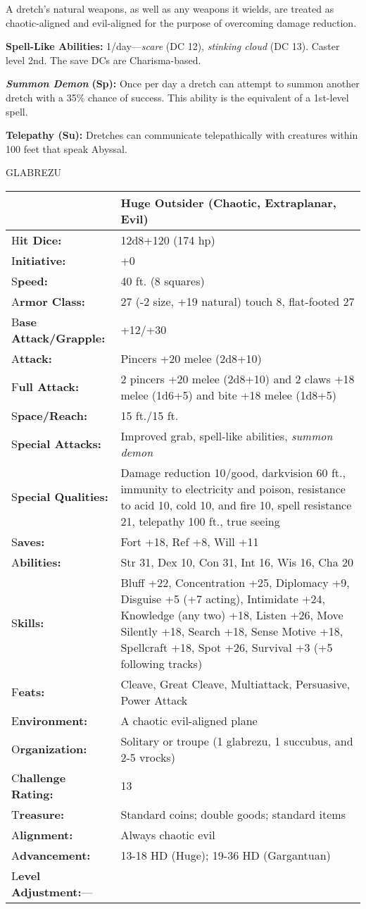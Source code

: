 \documentclass{article}
\begin{document}
A dretch's natural weapons, as well as any weapons it wields, are treated as chaotic-aligned 
and evil-aligned for the purpose of overcoming damage reduction.

\textbf{Spell-Like Abilities:} 1/day---\textit{scare }(DC 12), \textit{stinking 
cloud }(DC 13). Caster level 2nd. The save DCs are Charisma-based.

\textit{\textbf{Summon Demon }}\textbf{(Sp):} Once per day a dretch can attempt 
to summon another dretch with a 35\% chance of success. This ability is the equivalent 
of a 1st-level spell.

\textbf{Telepathy (Su): }Dretches can communicate telepathically with creatures 
within 100 feet that speak Abyssal.

\vspace{12pt}
GLABREZU

\begin{tabular}{|>{\raggedright}p{91pt}|>{\raggedright}p{203pt}|}
\hline
  & Huge Outsider (Chaotic, Extraplanar, Evil)\tabularnewline
\hline
H\textbf{it Dice:} & 12d8+120 (174 hp)\tabularnewline
\hline
I\textbf{nitiative:} & +0\tabularnewline
\hline
S\textbf{peed:} & 40 ft. (8 squares)\tabularnewline
\hline
A\textbf{rmor Class:} & 27 (-2 size, +19 natural) touch 8, flat-footed 27\tabularnewline
\hline
B\textbf{ase Attack/Grapple:} & +12/+30\tabularnewline
\hline
A\textbf{ttack:} & Pincers +20 melee (2d8+10)\tabularnewline
\hline
F\textbf{ull Attack:} & 2 pincers +20 melee (2d8+10) and 2 claws +18 melee (1d6+5) 
and bite +18 melee (1d8+5)\tabularnewline
\hline
S\textbf{pace/Reach:} & 15 ft./15 ft.\tabularnewline
\hline
S\textbf{pecial Attacks:} & Improved grab, spell-like abilities, \textit{summon 
demon}\tabularnewline
\hline
S\textbf{pecial Qualities:} & Damage reduction 10/good, darkvision 60 ft., immunity 
to electricity and poison, resistance to acid 10, cold 10, and fire 10, spell resistance 
21, telepathy 100 ft., true seeing\tabularnewline
\hline
S\textbf{aves:} & Fort +18, Ref +8, Will +11\tabularnewline
\hline
A\textbf{bilities:} & Str 31, Dex 10, Con 31, Int 16, Wis 16, Cha 20\tabularnewline
\hline
S\textbf{kills:} & Bluff +22, Concentration +25, Diplomacy +9, Disguise +5 (+7 
acting), Intimidate +24, Knowledge (any two) +18, Listen +26, Move Silently +18, 
Search +18, Sense Motive +18, Spellcraft +18, Spot +26, Survival +3 (+5 following 
tracks)\tabularnewline
\hline
F\textbf{eats:} & Cleave, Great Cleave, Multiattack, Persuasive, Power Attack\tabularnewline
\hline
E\textbf{nvironment:} & A chaotic evil-aligned plane\tabularnewline
\hline
O\textbf{rganization:} & Solitary or troupe (1 glabrezu, 1 succubus, and 2-5 vrocks)\tabularnewline
\hline
C\textbf{hallenge Rating:} & 13\tabularnewline
\hline
T\textbf{reasure:} & Standard coins; double goods; standard items\tabularnewline
\hline
A\textbf{lignment:} & Always chaotic evil\tabularnewline
\hline
A\textbf{dvancement:} & 13-18 HD (Huge); 19-36 HD (Gargantuan)\tabularnewline
\hline
L\textbf{evel Adjustment:}--- & \tabularnewline
\hline
\end{tabular}
\end{document}
